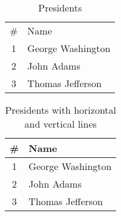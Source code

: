 
\begin{table}
    \caption{Presidents}
    \begin{center}
        \begin{tabular}{cl}
            \#& Name\\
            1&  George Washington\\
            2&  John Adams\\
            3&  Thomas Jefferson\\
        \end{tabular}
    \end{center}
\end{table}

\begin{table}
    \caption{Presidents with horizontal and vertical lines}
    \begin{center}
        \begin{tabular}{|c|l|}
            \hline
            \#& Name\\
            \hline
            1&  George Washington\\
            \hline
            2&  John Adams\\
            \hline
            3&  Thomas Jefferson\\
            \hline
        \end{tabular}
    \end{center}
\end{table}